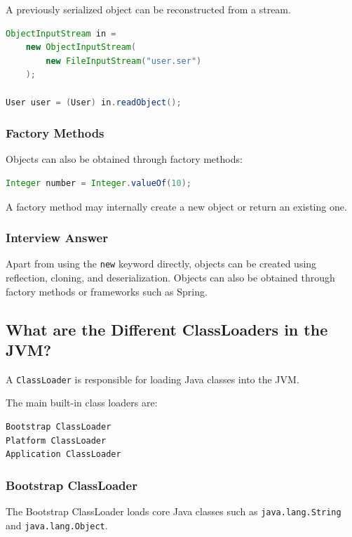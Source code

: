 \documentclass[12pt,a4paper]{article}
\begin{document}
A previously serialized object can be reconstructed from a stream.

\begin{lstlisting}[language=Java]
ObjectInputStream in =
    new ObjectInputStream(
        new FileInputStream("user.ser")
    );

User user = (User) in.readObject();
\end{lstlisting}

\subsubsection*{Factory Methods}

Objects can also be obtained through factory methods:

\begin{lstlisting}[language=Java]
Integer number = Integer.valueOf(10);
\end{lstlisting}

A factory method may internally create a new object or return an existing
one.

\subsubsection*{Interview Answer}

Apart from using the \texttt{new} keyword directly, objects can be created
using reflection, cloning, and deserialization. Objects can also be obtained
through factory methods or frameworks such as Spring.

\subsection{What are the Different ClassLoaders in the JVM?}

A \texttt{ClassLoader} is responsible for loading Java classes into the JVM.

The main built-in class loaders are:

\begin{verbatim}
Bootstrap ClassLoader
Platform ClassLoader
Application ClassLoader
\end{verbatim}

\subsubsection*{Bootstrap ClassLoader}

The Bootstrap ClassLoader loads core Java classes such as
\texttt{java.lang.String} and \texttt{java.lang.Object}.
\end{document}
